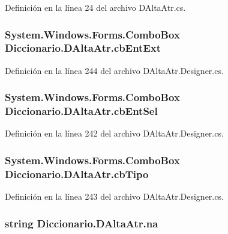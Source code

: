 Definición en la línea 24 del archivo D\-Alta\-Atr.\-cs.

\hypertarget{class_diccionario_1_1_d_alta_atr_a03f71bd5d4e3ae81ce9948b1e53d133e}{
\subsubsection[{cb\-Ent\-Ext}]{\setlength{\rightskip}{0pt plus 5cm}System.\-Windows.\-Forms.\-Combo\-Box Diccionario.\-D\-Alta\-Atr.\-cb\-Ent\-Ext}}\label{class_diccionario_1_1_d_alta_atr_a03f71bd5d4e3ae81ce9948b1e53d133e}


Definición en la línea 244 del archivo D\-Alta\-Atr.\-Designer.\-cs.

\hypertarget{class_diccionario_1_1_d_alta_atr_aec4fecf675bd5247ef5e988bba3580ac}{
\subsubsection[{cb\-Ent\-Sel}]{\setlength{\rightskip}{0pt plus 5cm}System.\-Windows.\-Forms.\-Combo\-Box Diccionario.\-D\-Alta\-Atr.\-cb\-Ent\-Sel}}\label{class_diccionario_1_1_d_alta_atr_aec4fecf675bd5247ef5e988bba3580ac}


Definición en la línea 242 del archivo D\-Alta\-Atr.\-Designer.\-cs.

\hypertarget{class_diccionario_1_1_d_alta_atr_a066e4fc451764a57389edde6df2b5222}{
\subsubsection[{cb\-Tipo}]{\setlength{\rightskip}{0pt plus 5cm}System.\-Windows.\-Forms.\-Combo\-Box Diccionario.\-D\-Alta\-Atr.\-cb\-Tipo}}\label{class_diccionario_1_1_d_alta_atr_a066e4fc451764a57389edde6df2b5222}


Definición en la línea 243 del archivo D\-Alta\-Atr.\-Designer.\-cs.

\hypertarget{class_diccionario_1_1_d_alta_atr_a6f63c75ec35559aeb823420993484b95}{
\subsubsection[{na}]{\setlength{\rightskip}{0pt plus 5cm}string Diccionario.\-D\-Alta\-Atr.\-na}}\label{class_diccionario_1_1_d_alta_atr_a6f63c75ec35559aeb823420993484b95}


